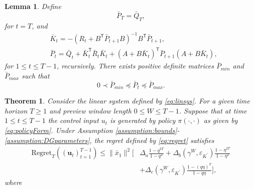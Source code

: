 \documentclass[letterpaper, 10 pt, conference]{ieeeconf}  %
\newcommand{\transpose}{\mathsf{T}}
\newtheorem{lemma}{Lemma}
\newtheorem{theorem}{Theorem}
\begin{document}
\begin{lemma}\label{lemma:boundedP}
    Define
    \begin{equation}
        \bar{P}_{T} = \bar{Q}_{T},
    \end{equation}
    for $t = T$, and 
    \begin{equation}
    \begin{split}
        &\bar{K}_{t} = -(R_{t}+ B^{\transpose}\bar{P}_{t+1}B)^{-1}B^{\transpose}\bar{P}_{t+1},\\
        &\bar{P}_{t} = \bar{Q}_{t} + \bar{K}_{t}^{\transpose}\bar{R}_{t}\bar{K}_{t} + (A+B\bar{K}_{t})^{\transpose}\bar{P}_{t+1}(A+B\bar{K}_{t}),
    \end{split}
    \end{equation}
    for $1\leq t \leq T-1$, recursively. There exists positive definite matrices $\bar{P}_{min}$ and $\bar{P}_{max}$ such that
    \begin{equation}
        0 \prec \bar{P}_{min} \preceq \bar{P}_{t} \preceq \bar{P}_{max}.
    \end{equation}
\end{lemma}
\begin{theorem}
Consider the linear system defined by \eqref{eq:linsys}. For a given time horizon $T \geq 1$ and preview window length $0 \leq W \leq T-1$. Suppose that at time $1 \leq t \leq T-1$ the control input $u_t$ is generated by policy $\pi(\cdot,\cdot)$ as given by \eqref{eq:policyForm}. Under Assumption \ref{assumption:bounds}-\ref{assumption:DGparameters}, the regret defined by \eqref{eq:regret} satisfies
    \begin{align*}
        \text{Regret}_{T}((\mathbf{u}_{t})_{t=1}^{T-1})
        \leq \|\bar{x}_{1}\|^{2}\bigg[&\Delta_{a}\frac{1-q^{2T}}{1-q^{2}} + \Delta_{b}(\gamma^{W},\varepsilon_{K^{'}})\frac{1-\eta^{2T}}{1-\eta^{2}}\\
        &+ \Delta_{c}(\gamma^{W},\varepsilon_{K^{'}})\frac{1-(q\eta)^{T}}{1-q\eta}\bigg],
    \end{align*}
    where 
\end{theorem}



\end{document}
